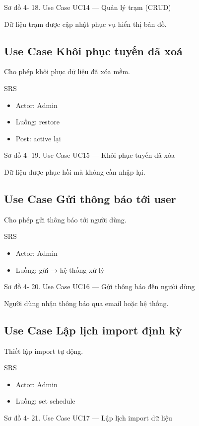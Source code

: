 \documentclass[13pt,a4paper]{report}
\begin{document}
Sơ đồ 4- 18. Use Case UC14 — Quản lý trạm (CRUD)

Dữ liệu trạm được cập nhật phục vụ hiển thị bản đồ.

\subsection{Use Case Khôi phục tuyến đã xoá}

Cho phép khôi phục dữ liệu đã xóa mềm.

SRS

\begin{itemize}
    \item Actor: Admin
    \item Luồng: restore
    \item Post: active lại
\end{itemize}

Sơ đồ 4- 19. Use Case UC15 — Khôi phục tuyến đã xóa

Dữ liệu được phục hồi mà không cần nhập lại.

\subsection{Use Case Gửi thông báo tới user}

Cho phép gửi thông báo tới người dùng.

SRS

\begin{itemize}
    \item Actor: Admin
    \item Luồng: gửi → hệ thống xử lý
\end{itemize}

Sơ đồ 4- 20. Use Case UC16 — Gửi thông báo đến người dùng

Người dùng nhận thông báo qua email hoặc hệ thống.

\subsection{Use Case Lập lịch import định kỳ}

Thiết lập import tự động.

SRS

\begin{itemize}
    \item Actor: Admin
    \item Luồng: set schedule
\end{itemize}

Sơ đồ 4- 21. Use Case UC17 — Lập lịch import dữ liệu
\end{document}
